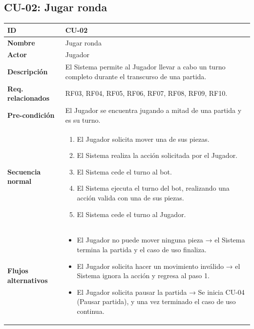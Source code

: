 \clearpage


\subsection{CU-02: Jugar ronda}

\begin{table}[H]
	\centering
	\begin{tabular}{|p{3cm}|p{14cm}|}
		\hline \textbf{ID} & CU-02 \\
		\hline \textbf{Nombre} & Jugar ronda \\
		\hline \textbf{Actor} & Jugador \\
		\hline \textbf{Descripción} & El Sistema permite al Jugador llevar a cabo un turno completo durante el transcurso de una partida. \\
		\hline \textbf{Req. relacionados} & RF03, RF04, RF05, RF06, RF07, RF08, RF09, RF10. \\
		\hline \textbf{Pre-condición} & El Jugador se encuentra jugando a mitad de una partida y es su turno. \\
		\hline
		\textbf{Secuencia normal} &
		\begin{enumerate}[nosep, before=\vspace{-0.4\baselineskip}]
			\item El Jugador solicita mover una de sus piezas.
			\item El Sistema realiza la acción solicitada por el Jugador.
			\item El Sistema cede el turno al bot.
			\item El Sistema ejecuta el turno del bot, realizando una acción valida con una de sus piezas.
			\item El Sistema cede el turno al Jugador.
		\end{enumerate} \\
		\hline
		\textbf{Flujos alternativos} &
		\begin{itemize}[nosep, before=\vspace{-0.4\baselineskip}]
			\item [{1.a.}] El Jugador no puede mover ninguna pieza → el Sistema termina la partida y el caso de uso finaliza.
			\item [{1.b.}] El Jugador solicita hacer un movimiento inválido → el Sistema ignora la acción y regresa al paso 1.
			\item [{1.c.}] El Jugador solicita pausar la partida → Se inicia CU-04 (Pausar partida), y una vez terminado el caso de uso continua.

\end{itemize}
\end{tabular}
\end{table}
